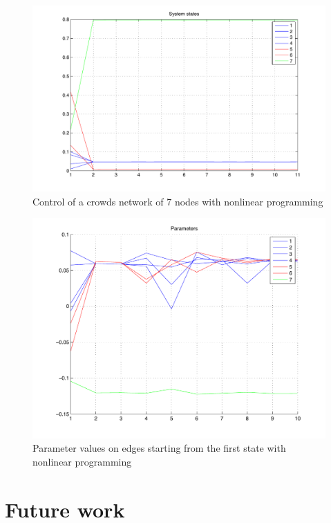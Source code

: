 \documentclass[a4paper, 11pt]{article}
\theoremstyle{definition}
\theoremstyle{remark}
\begin{document}
\begin{figure}[htbp!]
	\begin{center}
	\includegraphics[width=.8\textwidth]{images/nlp-states}
	\end{center}
	\caption{Control of a crowds network of 7 nodes with nonlinear programming}
	\label{fig:nlp-states}
\end{figure}

\begin{figure}[htbp!]
	\begin{center}
	\includegraphics[width=.8\textwidth]{images/nlp-params}
	\end{center}
	\caption{Parameter values on edges starting from the first state with nonlinear programming}
	\label{fig:nlp-params}
\end{figure}


\section{Future work} %
\label{sec:future_work}
\end{document}

